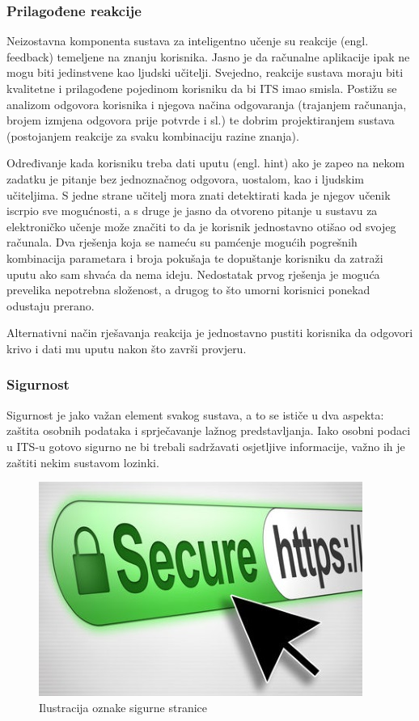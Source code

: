 \documentclass[times, utf8, zavrsni]{fer}
\begin{document}
\subsubsection{Prilagođene reakcije}
Neizostavna komponenta sustava za inteligentno učenje su reakcije (engl. feedback) temeljene na znanju korisnika. Jasno je da računalne aplikacije ipak ne mogu biti jedinstvene kao ljudski učitelji. Svejedno, reakcije sustava moraju biti kvalitetne i prilagođene pojedinom korisniku da bi ITS imao smisla. Postižu se analizom odgovora korisnika i njegova načina odgovaranja (trajanjem računanja, brojem izmjena odgovora prije potvrde i sl.) te dobrim projektiranjem sustava (postojanjem reakcije za svaku kombinaciju razine znanja).
\par
Određivanje kada korisniku treba dati uputu (engl. hint) ako je zapeo na nekom zadatku je pitanje bez jednoznačnog odgovora, uostalom, kao i ljudskim učiteljima. S jedne strane učitelj mora znati detektirati kada je njegov učenik iscrpio sve mogućnosti, a s druge je jasno da otvoreno pitanje u sustavu za elektroničko učenje može značiti to da je korisnik jednostavno otišao od svojeg računala. Dva rješenja koja se nameću su pamćenje mogućih pogrešnih kombinacija parametara i broja pokušaja te dopuštanje korisniku da zatraži uputu ako sam shvaća da nema ideju. Nedostatak prvog rješenja je moguća prevelika nepotrebna složenost, a drugog to što umorni korisnici ponekad odustaju prerano.
\par
Alternativni način rješavanja reakcija je jednostavno pustiti korisnika da odgovori krivo i dati mu uputu nakon što završi provjeru.

\subsubsection{Sigurnost}
Sigurnost je jako važan element svakog sustava, a to se ističe u dva aspekta: zaštita osobnih podataka i sprječavanje lažnog predstavljanja. Iako osobni podaci u ITS-u gotovo sigurno ne bi trebali sadržavati osjetljive informacije, važno ih je zaštiti nekim sustavom lozinki.

\begin{figure}[htb]
	\centering
	\includegraphics[]{img/security.jpg}
	\caption{Ilustracija oznake sigurne stranice}
	\label{fig:security}
\end{figure}
\end{document}
